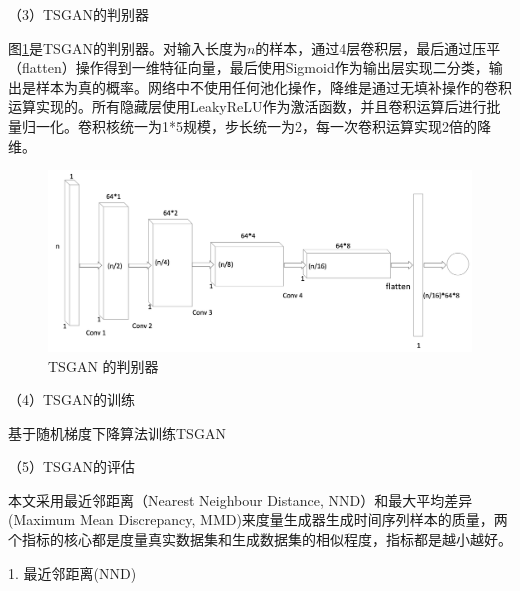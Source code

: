（3）TSGAN的判别器

图\ref{fig:gan-ts-discriminator}是TSGAN的判别器。对输入长度为$n$的样本，通过4层卷积层，最后通过压平（flatten）操作得到一维特征向量，最后使用Sigmoid作为输出层实现二分类，输出是样本为真的概率。网络中不使用任何池化操作，降维是通过无填补操作的卷积运算实现的。所有隐藏层使用LeakyReLU作为激活函数，并且卷积运算后进行批量归一化。卷积核统一为1*5规模，步长统一为2，每一次卷积运算实现2倍的降维。

\begin{figure}[H]
\centering
\includegraphics[scale=0.5]{figures/gan-ts-discriminator.png}
\caption{TSGAN 的判别器}
\label{fig:gan-ts-discriminator}
\end{figure}


（4）TSGAN的训练

\begin{algorithm}[H]
 \caption{基于随机梯度下降算法训练TSGAN}
 \renewcommand{\algorithmcfname}{算法}
 \label{gan-tsgan-algorithm}
\end{algorithm}

（5）TSGAN的评估

本文采用最近邻距离（Nearest Neighbour Distance, NND）和最大平均差异(Maximum Mean Discrepancy, MMD)来度量生成器生成时间序列样本的质量，两个指标的核心都是度量真实数据集和生成数据集的相似程度\cite{esteban2017real}，指标都是越小越好。

1. 最近邻距离(NND)

